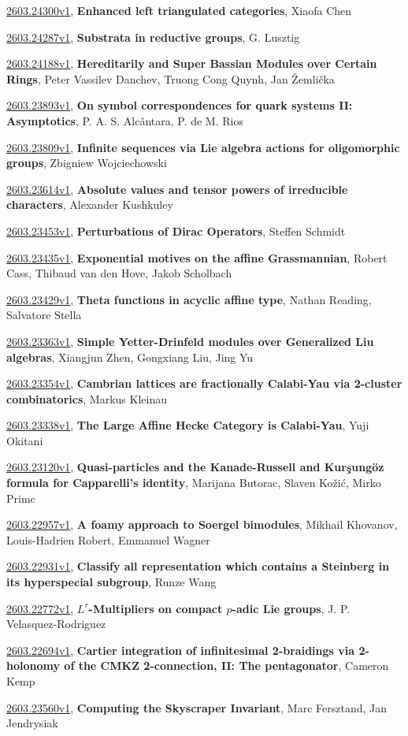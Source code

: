 \documentclass[9pt, a4paper]{article}
\theoremstyle{plain}
\theoremstyle{definition}
\theoremstyle{remark}
\newcommand{\arxiv}[3]{\href{https://arxiv.org/abs/#1}{#1}, \textbf{\textcolor{arxivblue}{#2}}, #3}
\begin{document}
\arxiv{2603.24300v1}{Enhanced left triangulated categories}{Xiaofa Chen}

\arxiv{2603.24287v1}{Substrata in reductive groups}{G. Lusztig}

\arxiv{2603.24188v1}{Hereditarily and Super Bassian Modules over Certain Rings}{Peter Vassilev Danchev, Truong Cong Quynh, Jan Žemlička}

\arxiv{2603.23893v1}{On symbol correspondences for quark systems II: Asymptotics}{P. A. S. Alcântara, P. de M. Rios}

\arxiv{2603.23809v1}{Infinite sequences via Lie algebra actions for oligomorphic groups}{Zbigniew Wojciechowski}

\arxiv{2603.23614v1}{Absolute values and tensor powers of irreducible characters}{Alexander Kushkuley}

\arxiv{2603.23453v1}{Perturbations of Dirac Operators}{Steffen Schmidt}

\arxiv{2603.23435v1}{Exponential motives on the affine Grassmannian}{Robert Cass, Thibaud van den Hove, Jakob Scholbach}

\arxiv{2603.23429v1}{Theta functions in acyclic affine type}{Nathan Reading, Salvatore Stella}

\arxiv{2603.23363v1}{Simple Yetter-Drinfeld modules over Generalized Liu algebras}{Xiangjun Zhen, Gongxiang Liu, Jing Yu}

\arxiv{2603.23354v1}{Cambrian lattices are fractionally Calabi-Yau via 2-cluster combinatorics}{Markus Kleinau}

\arxiv{2603.23338v1}{The Large Affine Hecke Category is Calabi-Yau}{Yuji Okitani}

\arxiv{2603.23120v1}{Quasi-particles and the Kanade-Russell and Kurşungöz formula for Capparelli's identity}{Marijana Butorac, Slaven Kožić, Mirko Primc}

\arxiv{2603.22957v1}{A foamy approach to Soergel bimodules}{Mikhail Khovanov, Louis-Hadrien Robert, Emmanuel Wagner}

\arxiv{2603.22931v1}{Classify all representation which contains a Steinberg in its hyperspecial subgroup}{Runze Wang}

\arxiv{2603.22772v1}{$L^r$-Multipliers on compact $p$-adic Lie groups}{J. P. Velasquez-Rodriguez}

\arxiv{2603.22694v1}{Cartier integration of infinitesimal 2-braidings via 2-holonomy of the CMKZ 2-connection, II: The pentagonator}{Cameron Kemp}

\arxiv{2603.23560v1}{Computing the Skyscraper Invariant}{Marc Fersztand, Jan Jendrysiak}
\end{document}
